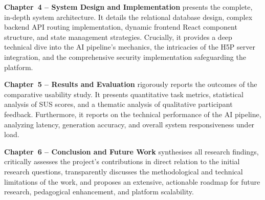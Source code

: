 \textbf{Chapter~4 -- System Design and Implementation} presents the complete, in-depth system architecture. It details the relational database design, complex backend API routing implementation, dynamic frontend React component structure, and state management strategies. Crucially, it provides a deep technical dive into the AI pipeline's mechanics, the intricacies of the H5P server integration, and the comprehensive security implementation safeguarding the platform.

\textbf{Chapter~5 -- Results and Evaluation} rigorously reports the outcomes of the comparative usability study. It presents quantitative task metrics, statistical analysis of SUS scores, and a thematic analysis of qualitative participant feedback. Furthermore, it reports on the technical performance of the AI pipeline, analyzing latency, generation accuracy, and overall system responsiveness under load.

\textbf{Chapter~6 -- Conclusion and Future Work} synthesises all research findings, critically assesses the project's contributions in direct relation to the initial research questions, transparently discusses the methodological and technical limitations of the work, and proposes an extensive, actionable roadmap for future research, pedagogical enhancement, and platform scalability.

